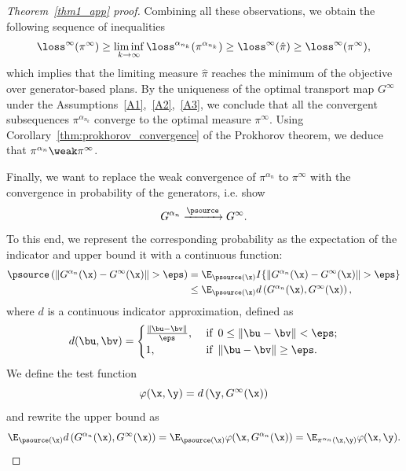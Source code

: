 \begin{proof}[Theorem~\ref{thm1_app} proof]
Combining all these observations, we obtain the following sequence of inequalities
\begin{equation}
    \loss^{\infty}(\pi^\infty) \geq \liminf\limits_{k \rightarrow \infty} \loss^{\alpha_{n_k}} (\pi^{\alpha_{n_k}}) \geq \loss^\infty(\hat{\pi}) \geq \loss^\infty(\pi^\infty),
\end{equation}
which implies that the limiting measure $\hat{\pi}$ reaches the minimum of the objective over generator-based plans. By the uniqueness of the optimal transport map $G^\infty$ under the Assumptions~\ref{A1},~\ref{A2},~\ref{A3}, we conclude that all the convergent subsequences $\pi^{\alpha_{n_k}}$ converge to the optimal measure $\pi^\infty$. Using Corollary~\ref{thm:prokhorov_convergence} of the Prokhorov theorem, we deduce that $\pi^{\alpha_n} \weak \pi^\infty$.

Finally, we want to replace the weak convergence of $\pi^{\alpha_n}$ to $\pi^\infty$ with the convergence in probability of the generators, i.e. show
\begin{equation}
    G^{\alpha_n} \xrightarrow[]{\psource} G^\infty.
\end{equation}
To this end, we represent the corresponding probability as the expectation of the indicator and upper bound it with a continuous function:
\begin{align}
    \psource\left(\|G^{\alpha_n}(\x) - G^{\infty}(\x)\| > \eps\right) &= \E_{\psource(\x)}I\{\|G^{\alpha_n}(\x) - G^{\infty}(\x)\| > \eps\} \\
    &\leq \E_{\psource(\x)} d\left(G^{\alpha_n}(\x), G^{\infty}(\x)\right),
\end{align}
where $d$ is a continuous indicator approximation, defined as
\begin{equation}
    d(\bu, \bv) = \begin{cases}
        \frac{\|\bu - \bv \|}{\eps}, &\text{ if }\, 0 \leq \|\bu - \bv \| < \eps;\\
        1, &\text{ if }\, \|\bu - \bv\| \geq \eps.
    \end{cases}
\end{equation}
We define the test function
\begin{equation}
    \varphi(\x, \y) = d\left(\y, G^\infty(\x)\right)
\end{equation}
and rewrite the upper bound as
\begin{equation}
    \E_{\psource(\x)} d\left(G^{\alpha_n}(\x), G^{\infty}(\x)\right) = \E_{\psource(\x)} \varphi(\x, G^{\alpha_n}(\x)) = \E_{\pi^{\alpha_n}(\x, \y)} \varphi(\x, \y).
\end{equation}


\end{proof}
